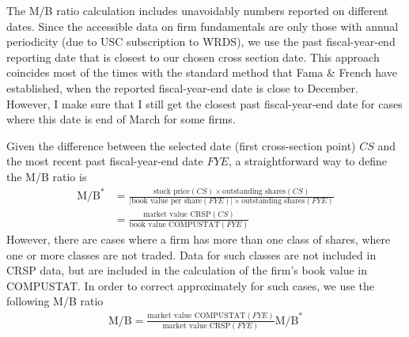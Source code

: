 \documentclass[12pt]{article}
\numberwithin{equation}{section}
\begin{document}
The M/B ratio calculation includes unavoidably numbers reported on
different dates. Since the accessible data on firm fundamentals are
only those with annual periodicity (due to USC subscription to
WRDS), we use the past fiscal-year-end reporting date that is
closest to our chosen cross section date. This approach coincides
most of the times with the standard method that Fama \& French have
established, when the reported fiscal-year-end date is close to
December. However, I make sure that I still get the closest past
fiscal-year-end date for cases where this date is end of March for
some firms.

Given the difference between the selected date (first cross-section
point) $CS$ and the most recent past fiscal-year-end date $FYE$, a
straightforward way to define the M/B ratio is
\begin{align*}
\text{M/B}^*&=\frac{\text{stock price}(CS)\times\text{outstanding
shares}(CS)}{|\text{book value per
share}(FYE)|\times\text{outstanding
shares}(FYE)}\\
&=\frac{\text{market value CRSP}(CS)}{\text{book value
COMPUSTAT}(FYE)}
\end{align*}
However, there are cases where a firm has more than one class of
shares, where one or more classes are not traded. Data for such
classes are not included in CRSP data, but are included in the
calculation of the firm's book value in COMPUSTAT. In order to
correct approximately for such cases, we use the following M/B ratio
\begin{align*}
\text{M/B}=\frac{\text{market value COMPUSTAT}(FYE)}{\text{market
value CRSP}(FYE)}\text{M/B}^*
\end{align*}
\end{document}
